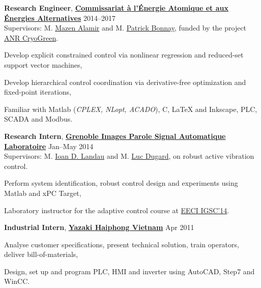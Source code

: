 \documentclass[a4paper,11pt]{article}
\begin{document}
	\textbf{Research Engineer},
	\href{http://www.cea.fr/}{\textbf{Commissariat \`{a} l'\'{E}nergie Atomique et aux \'{E}nergies Alternatives}}
	\hfill {2014--2017}\\
	Supervisors: M. \href{http://www.mazenalamir.fr/home/}{Mazen Alamir} and M. \href{https://www.researchgate.net/profile/P_Bonnay}{Patrick Bonnay}, funded by the project \href{http://www.agence-nationale-recherche.fr/Project-ANR-13-SEED-0005}{ANR CryoGreen}.
	\begin{innerlist}
		\item Develop explicit constrained control via nonlinear regression and reduced-set support vector machines,
		\item Develop hierarchical control coordination via derivative-free optimization and fixed-point iterations, 
		\item Familiar with Matlab (\emph{CPLEX, {NLopt}, ACADO}), C, LaTeX and Inkscape, PLC, SCADA and Modbus.
	\end{innerlist}
	
	\vspace{0.1cm}
	
	\textbf{Research Intern},
	\href{http://www.gipsa-lab.fr/}{\textbf{Grenoble Images Parole Signal Automatique Laboratoire}}
	\hfill {Jan--May 2014}\\
	Supervisors: M. \href{https://www.gipsa-lab.grenoble-inp.fr/~ioandore.landau/}{Ioan D. Landau} and M. \href{https://www.researchgate.net/profile/Luc_Dugard}{Luc Dugard}, on robust active vibration control.
	\begin{innerlist}
		\item Perform system identification, robust control design and experiments using Matlab and xPC Target,
		\item  Laboratory instructor for the adaptive control course at \href{http://www.eeci-igsc.eu/}{EECI IGSC'14}.
	\end{innerlist}
	
	\vspace{0.1cm}
	
	\textbf{Industrial Intern},
	\href{http://www.yhv.com.vn}{\textbf{Yazaki Haiphong Vietnam}}
	\hfill {Apr 2011}
	\begin{innerlist}
		\item Analyse customer specifications, present technical solution, train operators, deliver bill-of-materials,
		\item Design, set up and program PLC, HMI and inverter using AutoCAD, Step7 and WinCC.
	\end{innerlist}
	
\end{document}
